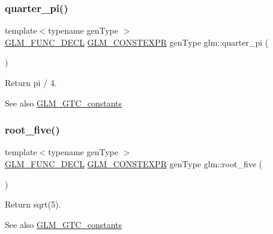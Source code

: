 \subsubsection{\texorpdfstring{quarter\+\_\+pi()}{quarter\_pi()}}
{\footnotesize\ttfamily template$<$typename gen\+Type $>$ \\
\hyperlink{setup_8hpp_ab2d052de21a70539923e9bcbf6e83a51}{G\+L\+M\+\_\+\+F\+U\+N\+C\+\_\+\+D\+E\+CL} \hyperlink{setup_8hpp_a08b807947b47031d3a511f03f89645ad}{G\+L\+M\+\_\+\+C\+O\+N\+S\+T\+E\+X\+PR} gen\+Type glm\+::quarter\+\_\+pi (\begin{DoxyParamCaption}{ }\end{DoxyParamCaption})}

Return pi / 4. \begin{DoxySeeAlso}{See also}
\hyperlink{group__gtc__constants}{G\+L\+M\+\_\+\+G\+T\+C\+\_\+constants} 
\end{DoxySeeAlso}
\mbox{\label{group__gtc__constants_gae9ebbded75b53d4faeb1e4ef8b3347a2}} 
\subsubsection{\texorpdfstring{root\+\_\+five()}{root\_five()}}
{\footnotesize\ttfamily template$<$typename gen\+Type $>$ \\
\hyperlink{setup_8hpp_ab2d052de21a70539923e9bcbf6e83a51}{G\+L\+M\+\_\+\+F\+U\+N\+C\+\_\+\+D\+E\+CL} \hyperlink{setup_8hpp_a08b807947b47031d3a511f03f89645ad}{G\+L\+M\+\_\+\+C\+O\+N\+S\+T\+E\+X\+PR} gen\+Type glm\+::root\+\_\+five (\begin{DoxyParamCaption}{ }\end{DoxyParamCaption})}

Return sqrt(5). \begin{DoxySeeAlso}{See also}
\hyperlink{group__gtc__constants}{G\+L\+M\+\_\+\+G\+T\+C\+\_\+constants} 
\end{DoxySeeAlso}
\mbox{\label{group__gtc__constants_ga4e276cb823cc5e612d4f89ed99c75039}} 
